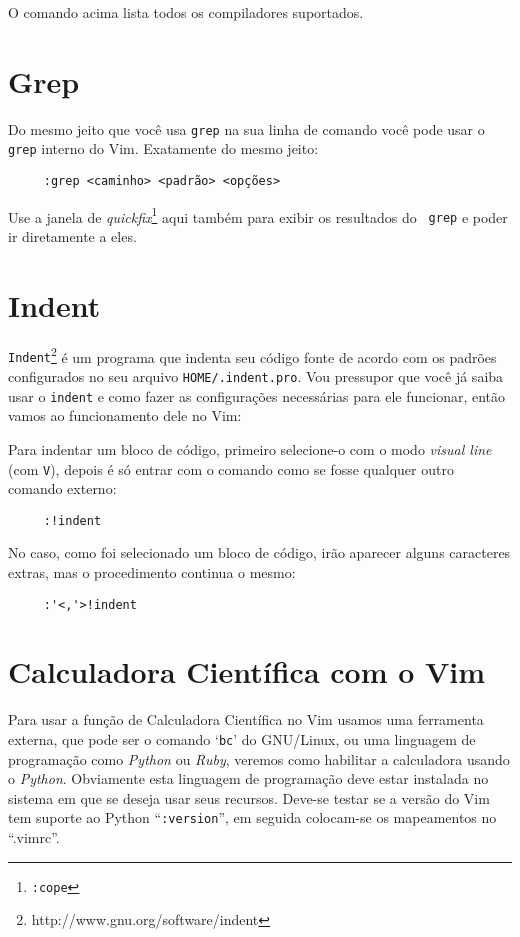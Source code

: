 O comando acima lista todos os compiladores suportados.

\section{Grep}
\label{sec:Grep}

Do mesmo jeito que você usa {\tt grep} na sua linha de comando você pode usar
o {\tt grep} interno do Vim. Exatamente do mesmo jeito:

\begin{verbatim}
     :grep <caminho> <padrão> <opções>
\end{verbatim}

Use a janela de {\em quickfix}\footnote{{\tt :cope}} aqui também para exibir os resultados do {\tt
grep} e poder ir diretamente a eles.

\section{Indent}

{\tt Indent}\footnote{http://www.gnu.org/software/indent} 
é um programa que indenta seu código fonte de acordo com os padrões configurados
no seu arquivo {\tt HOME/.indent.pro}. Vou pressupor que você já saiba usar o {\tt indent}
e como fazer as configurações necessárias para ele funcionar, então vamos ao funcionamento 
dele no Vim:

Para indentar um bloco de código, primeiro selecione-o com o modo {\em visual line} (com {\tt V}), 
depois é só entrar com o comando como se fosse qualquer outro comando externo:
\begin{verbatim}
     :!indent
\end{verbatim}

No caso, como foi selecionado um bloco de código, irão aparecer alguns caracteres extras, 
mas o procedimento continua o mesmo:
\begin{verbatim}
     :'<,'>!indent
\end{verbatim}


\section{Calculadora Científica com o Vim}
\label{sec:Calculadora Científica com o Vim}

Para usar a função de Calculadora Científica no Vim usamos uma ferramenta
externa, que pode ser o comando `{\tt bc}' do GNU/Linux, ou uma linguagem de
programação como {\em Python} ou {\em Ruby}, veremos como habilitar a
calculadora usando o {\em Python}. Obviamente esta linguagem de programação
deve estar instalada no sistema em que se deseja usar seus recursos.  Deve-se
testar se a versão do Vim tem suporte ao Python ``\verb+:version+'', em seguida
colocam-se os mapeamentos no ``.vimrc''.

